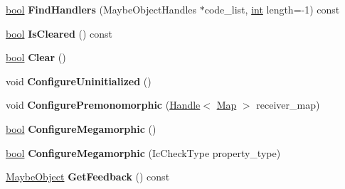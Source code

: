 \begin{DoxyCompactItemize}
\item 
\mbox{\label{classv8_1_1internal_1_1FeedbackNexus_a64fd1c6e4be061fe012624476aafe393}} 
\mbox{\hyperlink{classbool}{bool}} {\bfseries Find\+Handlers} (Maybe\+Object\+Handles $\ast$code\+\_\+list, \mbox{\hyperlink{classint}{int}} length=-\/1) const
\item 
\mbox{\label{classv8_1_1internal_1_1FeedbackNexus_aa8f37e73e404732659e971bc91aa99c4}} 
\mbox{\hyperlink{classbool}{bool}} {\bfseries Is\+Cleared} () const
\item 
\mbox{\label{classv8_1_1internal_1_1FeedbackNexus_a0931bf2b1a78e472ee452a2d15add852}} 
\mbox{\hyperlink{classbool}{bool}} {\bfseries Clear} ()
\item 
\mbox{\label{classv8_1_1internal_1_1FeedbackNexus_a9112fa8fdd603518310d101a033b1e12}} 
void {\bfseries Configure\+Uninitialized} ()
\item 
\mbox{\label{classv8_1_1internal_1_1FeedbackNexus_a1c7da8692fe3a69d287a2ee9cc2215e2}} 
void {\bfseries Configure\+Premonomorphic} (\mbox{\hyperlink{classv8_1_1internal_1_1Handle}{Handle}}$<$ \mbox{\hyperlink{classv8_1_1internal_1_1Map}{Map}} $>$ receiver\+\_\+map)
\item 
\mbox{\label{classv8_1_1internal_1_1FeedbackNexus_ac31adff10a8eca557dddaf314ad8dd58}} 
\mbox{\hyperlink{classbool}{bool}} {\bfseries Configure\+Megamorphic} ()
\item 
\mbox{\label{classv8_1_1internal_1_1FeedbackNexus_a65b88dcebf601c1af6ffcdda691f5a0d}} 
\mbox{\hyperlink{classbool}{bool}} {\bfseries Configure\+Megamorphic} (Ic\+Check\+Type property\+\_\+type)
\item 
\mbox{\label{classv8_1_1internal_1_1FeedbackNexus_a42af3207cdcd7722ae7c7acc97b2d2ae}} 
\mbox{\hyperlink{classv8_1_1internal_1_1MaybeObject}{Maybe\+Object}} {\bfseries Get\+Feedback} () const
\item 
\mbox{\label{classv8_1_1internal_1_1FeedbackNexus_ac3cbe07dab984803e1f578ca7ac34525}} 

\end{DoxyCompactItemize}
